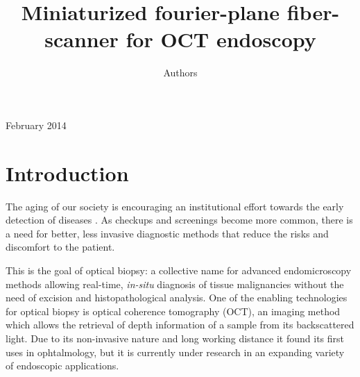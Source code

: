 \documentclass[10pt]{iopart}
\begin{document}
\title[Miniaturized fourier-plane fiber-scanner for OCT endoscopy]{Miniaturized fourier-plane fiber-scanner for OCT endoscopy}

\author{Authors}

\address{Address}
\vspace{10pt}
\begin{indented}
\item[]February 2014
\end{indented}

\begin{abstract}


\end{abstract}
%
%
%
% 
\ioptwocol
%

\section{Introduction}
The aging of our society is encouraging an institutional effort towards the early detection of diseases \cite{Fendrich2007}. As checkups and screenings become more common, there is a need for better, less invasive diagnostic methods that reduce the risks and discomfort to the patient. 

This is the goal of optical biopsy: a collective name for advanced endomicroscopy methods allowing real-time, \textit{in-situ} diagnosis of tissue malignancies without the need of excision and histopathological analysis. One of the enabling technologies for optical biopsy is optical coherence tomography (OCT), an imaging method which allows the retrieval of depth information of a sample from its backscattered light.  Due to its non-invasive nature and long working distance it found its first uses in ophtalmology, but it is currently under research in an expanding variety of endoscopic applications. 
\end{document}
